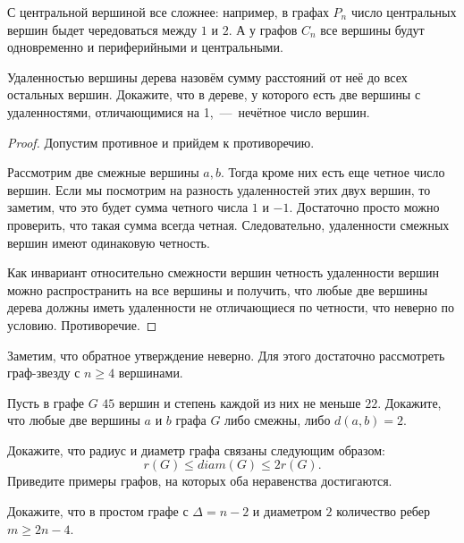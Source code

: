 	С центральной вершиной все сложнее: например, в графах $P_n$ число центральных вершин быдет чередоваться между $1$ и $2$. А у графов $C_n$ все вершины будут одновременно и периферийными и центральными.

\begin{statement}
	Удаленностью вершины дерева назовём сумму расстояний от неё до всех остальных вершин. Докажите, что в дереве, у которого есть две вершины с удаленностями, отличающимися на 1,~---~нечётное число вершин.
	
\begin{proof}
	Допустим противное и прийдем к противоречию.
		
	Рассмотрим две смежные вершины $a, b$. Тогда кроме них есть еще четное число вершин. Если мы посмотрим на разность удаленностей этих двух вершин, то заметим, что это будет сумма четного числа $1$ и $-1$. Достаточно просто можно проверить, что такая сумма всегда четная. Следовательно, удаленности смежных вершин имеют одинаковую четность. 
	
	Как инвариант относительно смежности вершин четность удаленности вершин можно распространить на все вершины и получить, что любые две вершины дерева должны иметь удаленности не отличающиеся по четности, что неверно по условию. Противоречие.
\end{proof}
\end{statement}

	Заметим, что обратное утверждение неверно. Для этого достаточно рассмотреть граф-звезду с $n \geqslant 4$ вершинами.	
	

\begin{exersize}
	Пусть в графе $G$ $45$ вершин и степень каждой из них не меньше $22$. Докажите, что любые две вершины $a$ и $b$ графа $G$ либо смежны, либо $d (a, b) = 2$. 
\end{exersize}	

\begin{exersize}
	Докажите, что радиус и диаметр графа связаны следующим образом:
	$$r(G) \leqslant diam (G) \leqslant 2r(G).$$
	Приведите примеры графов, на которых оба неравенства достигаются.
\end{exersize}

\begin{exersize}
	Докажите, что в простом графе с $\Delta = n-2$ и диаметром $2$
	количество ребер $m \geqslant 2n - 4$.
\end{exersize}


